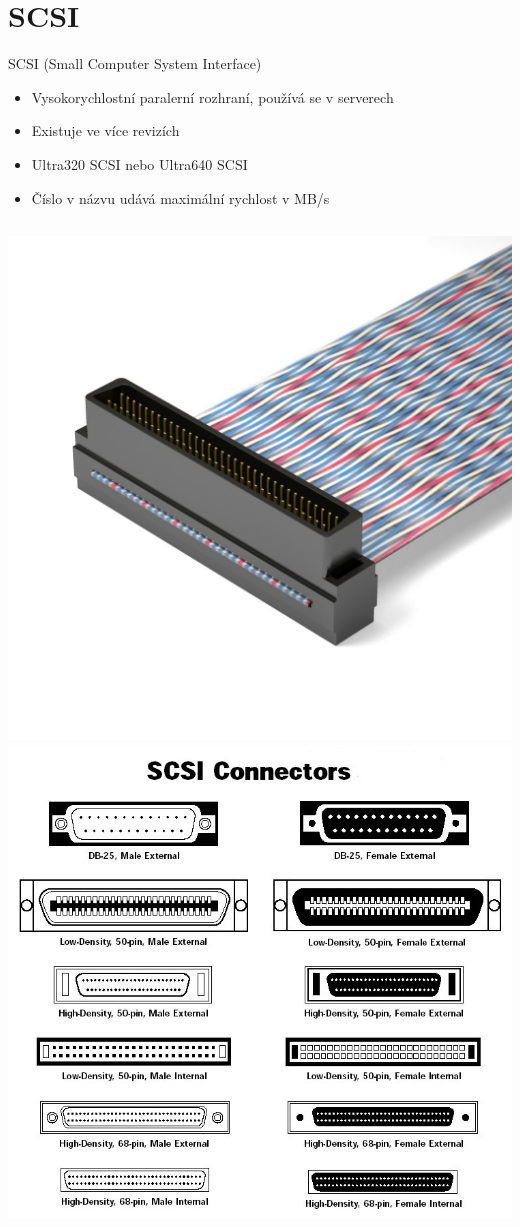 \documentclass[aspectratio=43]{beamer}
\begin{document}
\section{SCSI}
\begin{frame}{SCSI (Small Computer System Interface)}
	\begin{itemize}
		\item Vysokorychlostní paralerní rozhraní, používá se v serverech
		\item Existuje ve více revizích 
		\item Ultra320 SCSI nebo Ultra640 SCSI
		\item Číslo v názvu udává maximální rychlost v MB/s
	\end{itemize}
	\begin{columns}
		\includegraphics[width=1\linewidth]{extrahovane_obrazky/scsi_c.jpeg}
		\includegraphics[width=1\linewidth]{extrahovane_obrazky/scsi_all.jpeg}

\end{columns}
\end{frame}
\end{document}
